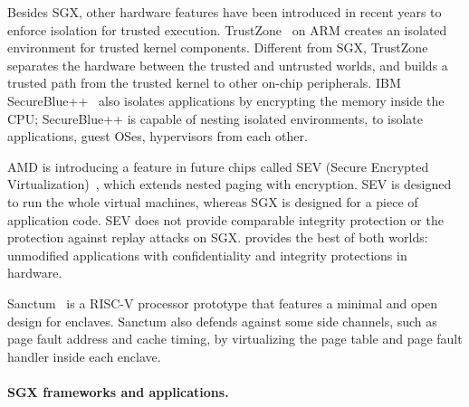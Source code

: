 Besides SGX, other hardware features have been introduced in recent years to enforce isolation for trusted execution.
TrustZone~\cite{trustzone} on ARM
creates an isolated environment for trusted kernel components. 
Different from SGX, TrustZone separates the hardware between the trusted and untrusted worlds,
and builds a trusted path from the trusted kernel to other on-chip peripherals.
IBM SecureBlue++~\cite{secureblue++} also isolates applications by encrypting the memory inside the CPU; SecureBlue++ is capable of nesting isolated environments, to isolate applications, guest OSes, hypervisors from each other.



AMD is introducing a feature in future chips called SEV (Secure Encrypted Virtualization)~\cite{amd-sme},
which extends nested paging with encryption.
SEV is designed to run the whole virtual machines, whereas SGX is designed for 
a piece of application code.
SEV does not provide comparable integrity protection or the protection against replay attacks on SGX.
\graphenesgx{} provides the best of both worlds: unmodified applications with confidentiality and integrity protections in hardware.




Sanctum~\cite{costan2016sanctum} is a RISC-V processor prototype 
that features a 
minimal and open design for enclaves.
Sanctum also defends against some side channels, such as page fault address and cache timing, by virtualizing the page table and page fault handler inside each enclave.


\paragraph{SGX frameworks and applications.}

